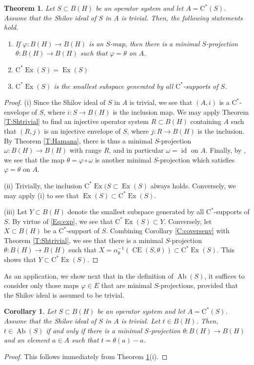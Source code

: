 \documentclass[10pt]{amsart}
\newcommand{\rC}{\mathrm{C}}
\renewcommand{\phi}{\varphi}
\newcommand{\Ab}{\operatorname{Ab}}
\newcommand{\CE}{\operatorname{CE}}
\newcommand{\Exp}{\operatorname{Ex}}
\newcommand{\id}{\operatorname{id}}
\newtheorem{theorem}[lemma]{Theorem}
\newtheorem{corollary}[lemma]{Corollary}
\theoremstyle{definition}
\begin{document}
\begin{theorem}\label{T:expanse}
Let $S\subset B(H)$ be an operator system and let $A=\rC^*(S)$. Assume that the Shilov ideal of $S$ in $A$ is trivial. Then, the following statements hold.
\begin{enumerate}[{\rm (i)}]
\item If $\phi:B(H)\to B(H)$ is an $S$-map, then there is a minimal $S$-projection $\theta:B(H)\to B(H)$ such that $\phi=\theta$ on $A$.
\item $\rC^*\Exp(S)=\Exp(S)$
\item $\rC^*\Exp(S)$ is the smallest subspace generated by all $\rC^*$-supports of $S$.
\end{enumerate}
\end{theorem}
\begin{proof}
(i) Since the Shilov ideal of $S$ in $A$ is trivial, we see that $(A,i)$ is a $\rC^*$-envelope of $S$, where $i:S\to B(H)$ is the inclusion map. We may apply Theorem \ref{T:Shtrivial} to find an injective operator system $R\subset B(H)$  containing $A$ such that $(R,j)$ is an injective envelope of $S$, where $j:R\to B(H)$ is the inclusion. By Theorem \ref{T:Hamana}, there is thus a minimal $S$-projection $\omega:B(H)\to B(H)$ with range $R$, and in particular  $\omega=\id$ on $A$.  Finally, by \cite[Proposition 2.11]{paulsen2011}, we see that the map $\theta=\phi\circ \omega$ is another minimal $S$-projection which satisfies $\phi=\theta$ on $A$.

(ii) Trivially, the inclusion $\rC^*\Exp(S\subset \Exp(S)$ always holds. Conversely,  we may apply (i) to see that $\Exp(S)\subset \rC^*\Exp(S)$.

(iii) Let $Y\subset B(H)$ denote the smallest subspace generated by all $\rC^*$-supports of $S$. By virtue of \eqref{Eq:exp}, we see that $ \rC^*\Exp(S)\subset Y$. Conversely,  let $X\subset B(H)$ be a $\rC^*$-support of $S$. Combining Corollary \ref{C:coversenv} with Theorem \ref{T:Shtrivial}, we see that there is a minimal $S$-projection $\theta:B(H)\to B(H)$ such that $X=\alpha_\theta^{-1}(\CE(S,\theta))\subset \rC^*\Exp(S)$. This shows that $Y\subset \rC^*\Exp(S)$.
\end{proof}

As an application, we show next that in the definition of $\Ab(S)$, it suffices to consider only those maps $\phi\in E$ that are minimal $S$-projections, provided that the Shilov ideal is assumed to be trivial. 

\begin{corollary}\label{C:abminproj}
Let $S\subset B(H)$ be an operator system and let $A=\rC^*(S)$. Assume that the Shilov ideal of $S$ in $A$ is trivial. Let $t\in B(H)$. Then, $t\in \Ab(S)$ if and only if there is a minimal $S$-projection $\theta:B(H)\to B(H)$ and an element $a\in A$ such that $t=\theta(a)-a$.
\end{corollary}
\begin{proof}
This follows immediately from Theorem \ref{T:expanse}(i).
\end{proof}
\end{document}
